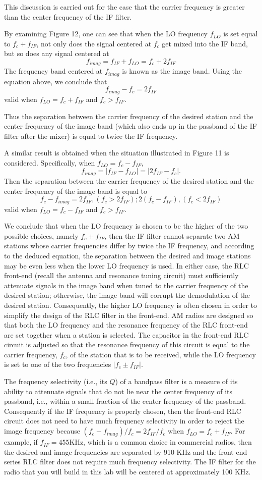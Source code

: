 \documentclass[a4paper]{article}
\begin{document}
This discussion is carried out for the case that the carrier frequency is greater than the center frequency of the IF filter.

By examining Figure 12, one can see that when the LO frequency $f_{LO}$ is set equal to $f_c+f_{IF}$, not only does the signal centered at $f_c$ get mixed into the IF band, but so does any signal centered at
$$f_{imag}=f_{IF}+f_{LO}=f_c+2f_{IF}$$
The frequency band centered at $f_{imag}$ is known as the image band. Using the equation above, we conclude that
$$f_{imag}-f_c=2f_{IF}$$
valid when $f_{LO}=f_c+f_{IF}$ and $f_c>f_{IF}$.

Thus the separation between the carrier frequency of the desired station and the center frequency of the image band (which also ends up in the passband of the IF filter after the mixer) is equal to twice the IF frequency.

A similar result is obtained when the situation illustrated in Figure 11 is considered. Specifically, when $f_{LO}=f_c-f_{IF}$,
$$f_{imag}=|f_{IF}-f_{LO}|=|2f_{IF}-f_c|.$$
Then the separation between the carrier frequency of the desired station and the center frequency of the image band is equal to
$$f_c-f_{imag}=2f_{IF},(f_c>2f_{IF}); 2(f_c-f_{IF}),(f_c<2f_{IF})$$
valid when $f_{LO}=f_c-f_{IF}$ and $f_c>f_{IF}$.

We conclude that when the LO frequency is chosen to be the higher of the two possible choices, namely $f_c+f_{IF}$, then the IF filter cannot separate two AM stations whose carrier frequencies differ by twice the IF frequency, and according to the deduced equation, the separation between the desired and image stations may be even less when the lower LO frequency is used. In either case, the RLC front-end (recall the antenna and resonance tuning circuit) must sufficiently attenuate signals in the image band when tuned to the carrier frequency of the desired station; otherwise, the image band will corrupt the demodulation of the desired station. Consequently, the higher LO frequency is often chosen in order to simplify the design of the RLC filter in the front-end. AM radios are designed so that both the LO frequency and the resonance frequency of the RLC front-end are set together when a station is selected. The capacitor in the front-end RLC circuit is adjusted so that the resonance frequency of this circuit is equal to the carrier frequency, $f_c$, of the station that is to be received, while the LO frequency is set to one of the two frequencies $|f_c\pm f_{IF}|$.

The frequency selectivity (i.e., its $Q$) of a bandpass filter is a measure of its ability to attenuate signals that do not lie near the center frequency of its passband, i.e., within a small fraction of the center frequency of the passband. Consequently if the IF frequency is properly chosen, then the front-end RLC circuit does not need to have much frequency selectivity in order to reject the image frequency because $(f_c-f_{imag})/f_c=2f_{IF}/f_c$ when $f_{LO}=f_c+f_{IF}$. For example, if $f_{IF}=455$KHz, which is a common choice in commercial radios, then the desired and image frequencies are separated by 910 KHz and the front-end series RLC filter does not require much frequency selectivity. The IF filter for the radio that you will build in this lab will be centered at approximately 100 KHz.
\end{document}
